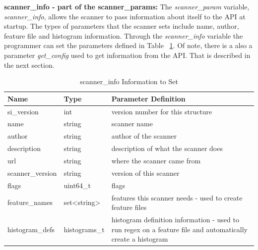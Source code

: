 \documentclass[11pt,fleqn]{article} %
\begin{document}
\textbf{scanner\_info - part of the scanner\_params:}
The \textit{scanner\_param} variable, \textit{scanner\_info}, allows the scanner to pass information about itself to the API at startup.  The types of parameters that the scanner sets include name, author, feature file and histogram information.  Through the \textit{scanner\_info} variable the programmer can set the parameters defined in Table ~\ref{tab:scannerinfotoset}. Of note, there is a also a parameter \textit{get\_config} used to get information from the API. That is described in the next section. 
\begin{table}[!ht]

\centering
\caption{scanner\_info Information to Set}
\label{tab:scannerinfotoset}
\begin{tabular}{|p{3 cm}|p{3cm}|p{7 cm}|}
\hline \hline
\textbf{Name} & \textbf{Type} & \textbf{Parameter Definition} \\
\hline
si\_version & int & version number for this structure \\
\hline
name & string & scanner name \\
\hline
author & string & author of the scanner \\
\hline
description & string & description of what the scanner does \\
\hline
url & string & where the scanner came from \\
\hline
scanner\_version & string & version of this scanner\\
\hline
flags & uint64\_t & flags \\
\hline
feature\_names & set<string> & features this scanner needs - used to create feature files\\
\hline
histogram\_defs & histograms\_t & histogram definition information - used to run regex on a feature file and automatically create a histogram \\
\hline
\end{tabular}
\end{table}
\end{document}
